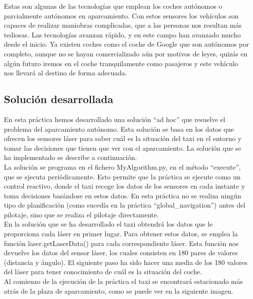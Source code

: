 Estas son algunas de las tecnologías que emplean los coches autónomos o parcialmente autónomos en aparcamiento. Con estos sensores los vehículos son capaces de realizar maniobras complicadas, que a las personas nos resultan más tediosas. Las tecnologías avanzan rápido, y en este campo han avanzado mucho desde el inicio. Ya existen coches como el coche de Google que son autónomos por completo, aunque no se hayan comercializado aún por motivos de leyes, quizás en algún futuro iremos en el coche tranquilamente como pasajeros y este vehículo nos llevará al destino de forma adecuada.

\subsection{Solución desarrollada}
En esta práctica hemos desarrollado una solución ``ad hoc'' que resuelve el problema del aparcamiento autónomo. Esta solución se basa en los datos que ofrecen los sensores láser para saber cuál es la situación del taxi en el entorno y tomar las decisiones que tienen que ver con el aparcamiento. La solución que se ha implementado se describe a continuación.\\

La solución se programa en el fichero MyAlgorithm.py, en el método ``execute'', que se ejecuta periódicamente. Esto permite que la práctica se ejecute como un control reactivo, donde el taxi recoge los datos de los sensores en cada instante y toma decisiones basándose en estos datos. En esta práctica no se realiza ningún tipo de planificación (como sucedía en la práctica ``global\_navigation'') antes del pilotaje, sino que se realiza el pilotaje directamente.\\


En la solución que se ha desarrollado el taxi obtendrá los datos que le proporciona cada láser en primer lugar. Para obtener estos datos, se emplea la función laser.getLaserData() para cada correspondiente láser. Esta función nos devuelve los datos del sensor láser, los cuales consisten en 180 pares de valores (distancia y ángulo). El siguiente paso ha sido hacer una media de los 180 valores del láser para tener conocimiento de cuál es la situación del coche. \\

Al comienzo de la ejecución de la práctica el taxi se encontrará estacionado más atrás de la plaza de aparcamiento, como se puede ver en la siguiente imagen.

